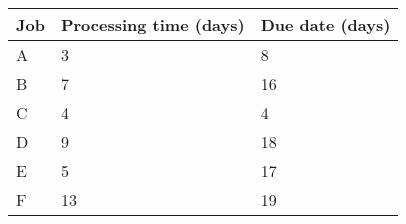 \begin{tabular}{|l|l|l|}
    \hline
    Job & Processing time (days) & Due date (days) \\
    \hline
    A   & 3                      & 8               \\
    \hline
    B   & 7                      & 16              \\
    \hline
    C   & 4                      & 4               \\
    \hline
    D   & 9                      & 18              \\
    \hline
    E   & 5                      & 17              \\
    \hline
    F   & 13                     & 19              \\
    \hline
\end{tabular}
